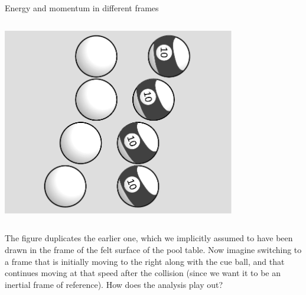 \begin{frame}{Energy and momentum in different frames}


  \begin{mycolumns}

    \begin{column}{.4\textwidth}\includegraphics[width=4in]{ch06/figs/pool-balls-energy-momentum}\end{column}

    \begin{column}{.6\textwidth}

      The figure duplicates the earlier one, which we implicitly assumed to have been drawn in the frame of
      the felt surface of the pool table. Now imagine switching to a frame that is initially moving to the
      right along with the cue ball, and that continues moving at that speed after the collision (since we want
      it to be an inertial frame of reference). How does the analysis play out?

    \end{column}
  \end{mycolumns}

\end{frame}

